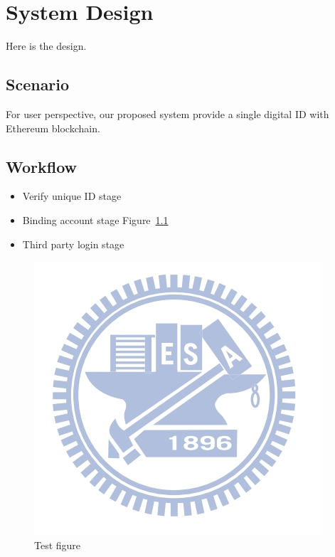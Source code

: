 \chapter{System Design}
\label{chapter:design}

Here is the design.

\section{Scenario}

    For user perspective, our proposed system provide a single digital ID with Ethereum blockchain.

\section{Workflow}

\begin{itemize}
    \item Verify unique ID stage~\cite{nctuurl}
    \item Binding account stage Figure~\ref{fig:nctu_logo}
    \item Third party login stage
\end{itemize}

\begin{figure}
    \centering
    \includegraphics[height=!,width=0.4\linewidth,keepaspectratio=true]{figures/nctu_logo.jpg}
    \caption{{\footnotesize Test figure}}
    \label{fig:nctu_logo}
\end{figure}